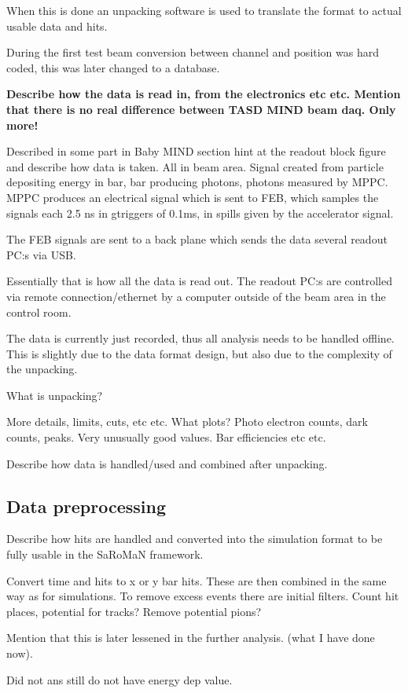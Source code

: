 When this is done an unpacking software is used to translate the format to actual usable data and hits. 

During the first test beam conversion between channel and position was hard coded, this was later changed to a database.  

\textbf{Describe how the data is read in, from the electronics etc etc. Mention that there is no real difference between TASD MIND beam daq. Only more! }

Described in some part in Baby MIND section hint at the readout block figure and describe how data is taken.  All in beam area. Signal created from particle depositing energy in bar, bar producing photons, photons measured by MPPC. MPPC produces an electrical signal which is sent to FEB, which samples the signals each 2.5 ns in gtriggers of 0.1ms, in spills given by the accelerator signal.

The FEB signals are sent to a back plane which sends the data several readout PC:s via USB.

Essentially that is how all the data is read out. The readout PC:s are controlled via remote connection/ethernet by a computer outside of the beam area in the control room.

The data is currently just recorded, thus all analysis needs to be handled offline. This is slightly due to the data format design, but also due to the complexity of the unpacking.

What is unpacking?

More details, limits, cuts, etc etc. What plots? Photo electron counts, dark counts, peaks. Very unusually good values. Bar efficiencies etc etc.

Describe how data is handled/used and combined after unpacking.

\subsection{Data preprocessing}
Describe how hits are handled and converted into the simulation format to be fully usable in the SaRoMaN framework.

Convert time and hits to x or y bar hits. These are then combined in the same way as for simulations. To remove excess events there are initial filters. Count hit places, potential for tracks? Remove potential pions? 

Mention that this is later lessened in the further analysis. (what I have done now).

Did not ans still do not have energy dep value.

